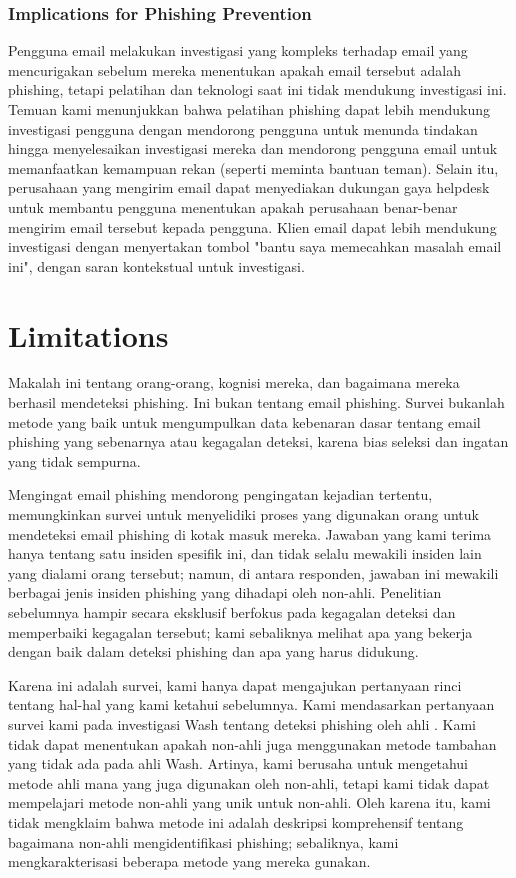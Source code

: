\documentclass[lettersize,journal]{IEEEtran}
\begin{document}
\subsubsection{Implications for Phishing Prevention}
Pengguna email melakukan investigasi yang kompleks terhadap email yang
mencurigakan sebelum mereka menentukan apakah email tersebut adalah phishing,
tetapi pelatihan dan teknologi saat ini tidak mendukung investigasi ini. Temuan
kami menunjukkan bahwa pelatihan phishing dapat lebih mendukung investigasi
pengguna dengan mendorong pengguna untuk menunda tindakan hingga menyelesaikan
investigasi mereka dan mendorong pengguna email untuk memanfaatkan kemampuan
rekan (seperti meminta bantuan teman). Selain itu, perusahaan yang mengirim
email dapat menyediakan dukungan gaya helpdesk untuk membantu pengguna
menentukan apakah perusahaan benar-benar mengirim email tersebut kepada
pengguna. Klien email dapat lebih mendukung investigasi dengan menyertakan
tombol "bantu saya memecahkan masalah email ini", dengan saran kontekstual
untuk investigasi.

\section{Limitations}
Makalah ini tentang orang-orang, kognisi mereka, dan bagaimana mereka berhasil
mendeteksi phishing. Ini bukan tentang email phishing. Survei bukanlah metode
yang baik untuk mengumpulkan data kebenaran dasar tentang email phishing yang
sebenarnya atau kegagalan deteksi, karena bias seleksi dan ingatan yang tidak
sempurna.

Mengingat email phishing mendorong pengingatan kejadian tertentu, memungkinkan
survei untuk menyelidiki proses yang digunakan orang untuk mendeteksi email
phishing di kotak masuk mereka. Jawaban yang kami terima hanya tentang satu
insiden spesifik ini, dan tidak selalu mewakili insiden lain yang dialami orang
tersebut; namun, di antara responden, jawaban ini mewakili berbagai jenis
insiden phishing yang dihadapi oleh non-ahli. Penelitian sebelumnya hampir
secara eksklusif berfokus pada kegagalan deteksi dan memperbaiki kegagalan
tersebut; kami sebaliknya melihat apa yang bekerja dengan baik dalam deteksi
phishing dan apa yang harus didukung.

Karena ini adalah survei, kami hanya dapat mengajukan pertanyaan rinci tentang
hal-hal yang kami ketahui sebelumnya. Kami mendasarkan pertanyaan survei kami
pada investigasi Wash tentang deteksi phishing oleh ahli \cite{tigaempat}. Kami
tidak dapat menentukan apakah non-ahli juga menggunakan metode tambahan yang
tidak ada pada ahli Wash. Artinya, kami berusaha untuk mengetahui metode ahli
mana yang juga digunakan oleh non-ahli, tetapi kami tidak dapat mempelajari
metode non-ahli yang unik untuk non-ahli. Oleh karena itu, kami tidak mengklaim
bahwa metode ini adalah deskripsi komprehensif tentang bagaimana non-ahli
mengidentifikasi phishing; sebaliknya, kami mengkarakterisasi beberapa metode
yang mereka gunakan.
\end{document}

